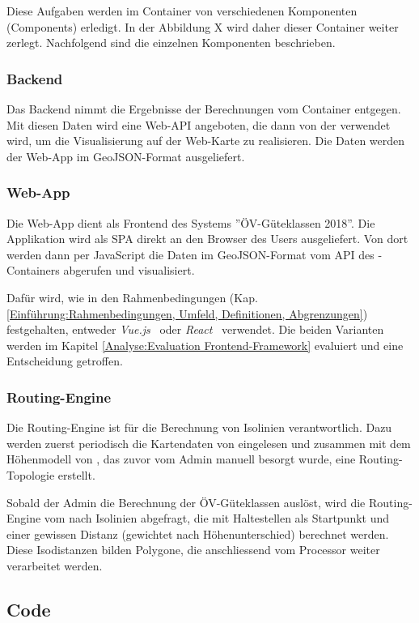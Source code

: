 Diese Aufgaben werden im Container von verschiedenen Komponenten (Components) erledigt.
In der Abbildung X wird daher dieser Container weiter zerlegt. Nachfolgend sind die einzelnen Komponenten beschrieben.


\subsubsection{Backend}
\label{container:Backend}

Das Backend nimmt die Ergebnisse der Berechnungen vom Container  entgegen.
Mit diesen Daten wird eine Web-\ac{API} angeboten, die dann von der  verwendet wird, um die Visualisierung auf der Web-Karte zu realisieren.
Die Daten werden der Web-App im \gls{GeoJSON}-Format ausgeliefert.


\subsubsection{Web-App}
\label{container:Web-App}

Die Web-App dient als Frontend des Systems ''\acs{ÖV}-Güteklassen 2018''.
Die Applikation wird als \ac{SPA} direkt an den Browser des Users ausgeliefert.
Von dort werden dann per JavaScript die Daten im \gls{GeoJSON}-Format vom \ac{API} des -Containers abgerufen und visualisiert.

Dafür wird, wie in den Rahmenbedingungen (Kap. \ref{Einführung:Rahmenbedingungen, Umfeld, Definitionen, Abgrenzungen}) festgehalten, entweder \emph{Vue.js}~\cite{vuejs} oder \emph{React}~\cite{react} verwendet.
Die beiden Varianten werden im Kapitel \ref{Analyse:Evaluation Frontend-Framework} evaluiert und eine Entscheidung getroffen.

\subsubsection{Routing-Engine}
\label{container:Routing-Engine}

Die Routing-Engine ist für die Berechnung von Isolinien verantwortlich.
Dazu werden zuerst periodisch die Kartendaten von  eingelesen und zusammen mit dem Höhenmodell von , das zuvor vom Admin manuell besorgt wurde, eine Routing-Topologie erstellt.

Sobald der Admin die Berechnung der ÖV-Güteklassen auslöst, wird die Routing-Engine vom  nach Isolinien abgefragt, die mit Haltestellen als Startpunkt und einer gewissen Distanz (gewichtet nach Höhenunterschied) berechnet werden.
Diese Isodistanzen bilden Polygone, die anschliessend vom Processor weiter verarbeitet werden.


\subsection{Code}
\label{Architektur:Code}

